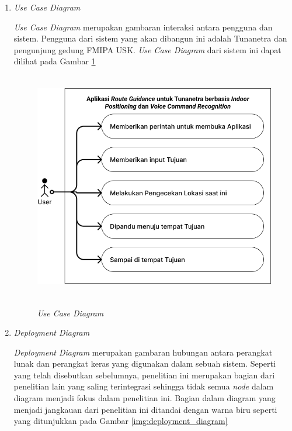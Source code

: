 \begin{enumerate}
\item \textit{Use Case Diagram}
\par \textit{Use Case Diagram} merupakan gambaran interaksi antara pengguna dan sistem. Pengguna dari sistem yang akan dibangun ini adalah Tunanetra dan pengunjung gedung FMIPA USK. \textit{Use Case Diagram} dari sistem ini dapat dilihat pada Gambar \ref{img:use_case_diagram}

\begin{figure}[H]
\centering
{\includegraphics [width = 12cm, height= 10cm]{gambar/bab3/use_case_diagram}}
\caption{\textit{Use Case Diagram}}
\label{img:use_case_diagram}
\end{figure}


\item \textit{Deployment Diagram}
\par \textit{Deployment Diagram} merupakan gambaran hubungan antara perangkat lunak dan perangkat keras yang digunakan dalam sebuah sistem. Seperti yang telah disebutkan sebelumnya, penelitian ini merupakan bagian dari penelitian lain yang saling terintegrasi sehingga tidak semua \textit{node} dalam diagram menjadi fokus dalam penelitian ini. Bagian dalam diagram yang menjadi jangkauan dari penelitian ini ditandai dengan warna biru seperti yang ditunjukkan pada Gambar \ref{img:deployment_diagram}


\end{enumerate}
